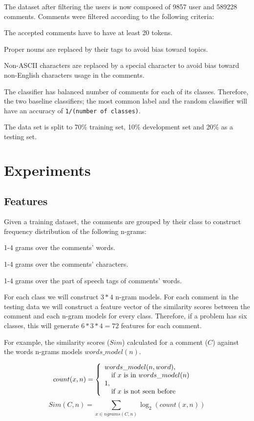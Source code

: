 \documentclass[10pt,a5paper,twoside]{article}
\begin{document}
The dataset after filtering the users is now composed of 9857 user and 589228
comments. Comments were filtered according to the following criteria:
\begin{compactitem}
\item The accepted comments have to have at least 20 tokens.
\item Proper nouns are replaced by their tags to avoid bias toward topics.
\item Non-ASCII characters are replaced by a special character to avoid bias
toward non-English characters usage in the comments.
\item The classifier has balanced number of comments for each of its classes.
  Therefore, the two baseline classifiers; the most common label and the random
  classifier will have an accuracy of \verb+1/(number of classes)+.
\item The data set is split to 70\% training set, 10\% development set and 20\%
as a testing set.
\end{compactitem}

\section{Experiments}
\subsection{Features}
\label{features}
Given a training dataset, the comments are grouped by their class to construct
frequency distribution of the following n-grams:
\begin{compactitem}
\item 1-4 grams over the comments' words.
\item 1-4 grams over the comments' characters.
\item 1-4 grams over the part of speech tags of comments' words.
\end{compactitem}
For each class we will construct $3*4$ n-gram models. For each comment in the
testing data we will construct a feature vector of the similarity scores between
the comment and each n-gram models for every class. Therefore, if a problem has six
classes, this will generate $6*3*4 = 72$ features for each comment.

For example, the similarity scores ($Sim$) calculated for a comment ($C$)
against the words n-grams models $words\_model(n)$.

\[
  count(x, n) = \left\{
  \begin{array}{l l}
    words\_model(n, word), & \\\quad \text{if $x$ is in $words\_model(n)$}\\
    1,&\\\quad \text{if $x$ is not seen before}\\
  \end{array} \right.
\]
\[
  Sim(C, n) = \sum_{x \in ngrams(C,n)} \log_2 (count(x, n))
\]
\end{document}
